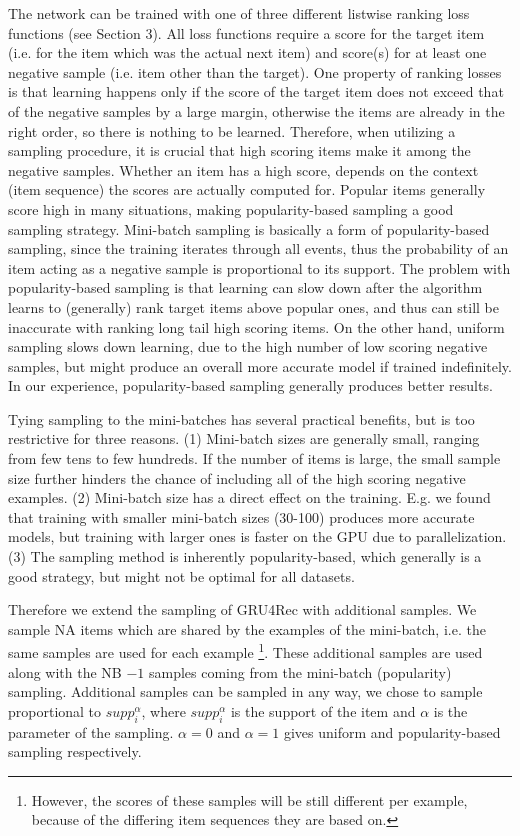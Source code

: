 \documentclass{article} %
\begin{document}
The network can be trained with one of three different listwise ranking loss functions (see Section 3).
All loss functions require a score for the target item (i.e. for the item which was the actual next
item) and score(s) for at least one negative sample (i.e. item other than the target). One property
of ranking losses is that learning happens only if the score of the target item does not exceed that
of the negative samples by a large margin, otherwise the items are already in the right order, so
there is nothing to be learned. Therefore, when utilizing a sampling procedure, it is crucial that
high scoring items make it among the negative samples. Whether an item has a high score, depends
on the context (item sequence) the scores are actually computed for. Popular items generally score
high in many situations, making popularity-based sampling a good sampling strategy. Mini-batch
sampling is basically a form of popularity-based sampling, since the training iterates through all
events, thus the probability of an item acting as a negative sample is proportional to its support. The
problem with popularity-based sampling is that learning can slow down after the algorithm learns
to (generally) rank target items above popular ones, and thus can still be inaccurate with ranking
long tail high scoring items. On the other hand, uniform sampling slows down learning, due to the
high number of low scoring negative samples, but might produce an overall more accurate model if
trained indefinitely. In our experience, popularity-based sampling generally produces better results.

Tying sampling to the mini-batches has several practical benefits, but is too restrictive for three
reasons. (1) Mini-batch sizes are generally small, ranging from few tens to few hundreds. If the
number of items is large, the small sample size further hinders the chance of including all of the high
scoring negative examples. (2) Mini-batch size has a direct effect on the training. E.g. we found that training with smaller mini-batch sizes (30-100) produces more accurate models, but training
with larger ones is faster on the GPU due to parallelization. (3) The sampling method is inherently
popularity-based, which generally is a good strategy, but might not be optimal for all datasets.

Therefore we extend the sampling of GRU4Rec with additional samples. We sample NA items
which are shared by the examples of the mini-batch, i.e. the same samples are used for each example \footnote[4]{However, the scores of these samples will be still different per example, because of the differing item sequences they are based on.}. These additional samples are used along with the NB $ − 1$ samples coming from the mini-batch (popularity) sampling. Additional samples can be sampled in any way, we chose to sample proportional to $supp^\alpha_i$, where $supp^{\alpha}_{i}$ is the support of the item and $\alpha$ is the parameter of the sampling. $\alpha = 0$ and $\alpha = 1$ gives uniform and popularity-based sampling respectively.
\end{document}
